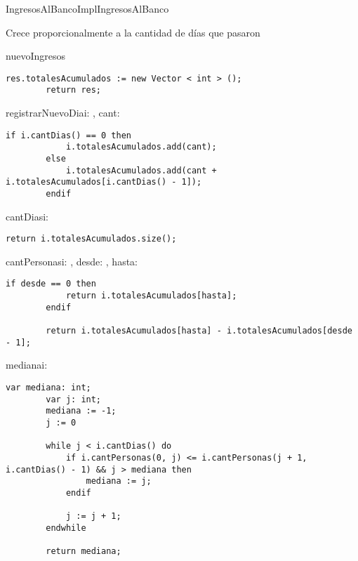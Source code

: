 \begin{module}{IngresosAlBancoImpl}{}{IngresosAlBanco}{}
	 \par
	Crece proporcionalmente a la cantidad de días que pasaron

	\begin{proc}{nuevoIngresos}{}{\moduletype}
		\begin{lstlisting}[numbers=none,frame=none]
		res.totalesAcumulados := new Vector < int > ();
		return res;
		\end{lstlisting}
	\end{proc}

	\begin{proc}{registrarNuevoDia}{\Inout i: \moduletype, \In cant: \Int}{}
		\begin{lstlisting}[numbers=none,frame=none]
		if i.cantDias() == 0 then
			i.totalesAcumulados.add(cant);
		else
			i.totalesAcumulados.add(cant + i.totalesAcumulados[i.cantDias() - 1]);
		endif
		\end{lstlisting}
	\end{proc}

	\begin{proc}{cantDias}{\In i: \moduletype}{\Int}
		\begin{lstlisting}[numbers=none,frame=none]
		return i.totalesAcumulados.size();
		\end{lstlisting}
	\end{proc}

	\begin{proc}{cantPersonas}{\In i: \moduletype, \In desde: \Int, \In hasta: \Int}{\Int}
		\begin{lstlisting}[numbers=none,frame=none]
		if desde == 0 then
			return i.totalesAcumulados[hasta];
		endif

		return i.totalesAcumulados[hasta] - i.totalesAcumulados[desde - 1];
		\end{lstlisting}
	\end{proc}

	\begin{proc}{mediana}{\In i: \moduletype}{\Int}
		\begin{lstlisting}[numbers=none,frame=none]
		var mediana: int;
		var j: int;
		mediana := -1;
		j := 0

		while j < i.cantDias() do
			if i.cantPersonas(0, j) <= i.cantPersonas(j + 1, i.cantDias() - 1) && j > mediana then
				mediana := j;
			endif

			j := j + 1;
		endwhile

		return mediana;
		\end{lstlisting}
	\end{proc}
\end{module}

